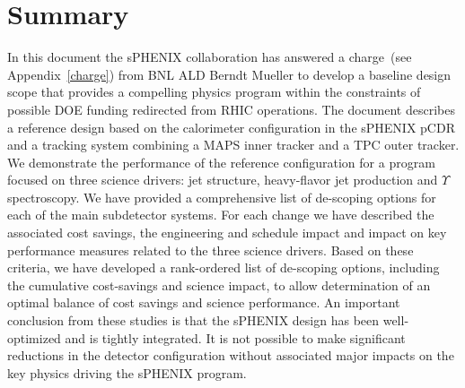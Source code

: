 \section{Summary}

In this document the sPHENIX collaboration has answered a charge~(see
Appendix~\ref{charge}) from BNL ALD Berndt Mueller to develop a
baseline design scope that provides a compelling physics program
within the constraints of possible DOE funding redirected from RHIC
operations. The document describes a reference design based on the
calorimeter configuration in the sPHENIX pCDR and a tracking system
combining a MAPS inner tracker and a TPC outer tracker. We demonstrate
the performance of the reference configuration for a program focused
on three science drivers: jet structure, heavy-flavor jet production
and $\Upsilon$ spectroscopy.  We have provided a comprehensive list of
de-scoping options for each of the main subdetector systems. For each
change we have described the associated cost savings, the engineering
and schedule impact and impact on key performance measures related to
the three science drivers. Based on these criteria, we have developed
a rank-ordered list of de-scoping options, including the cumulative
cost-savings and science impact, to allow determination of an optimal
balance of cost savings and science performance. An important
conclusion from these studies is that the sPHENIX design has been
well-optimized and is tightly integrated. It is not possible to make
significant reductions in the detector configuration without
associated major impacts on the key physics driving the sPHENIX
program.
